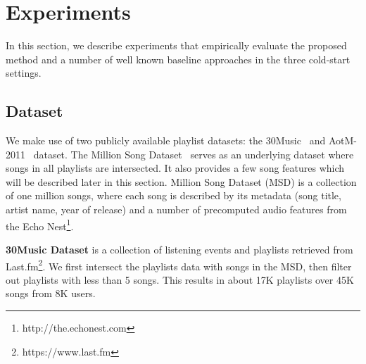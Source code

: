 \section{Experiments}
\label{sec:experiment}

In this section, we describe experiments that empirically evaluate the proposed method and a number of 
well known baseline approaches in the three cold-start settings. %


\subsection{Dataset}
We make use of two publicly available playlist datasets: the 30Music~\cite{30music2015} and AotM-2011~\cite{mcfee2012hypergraph} dataset.
The Million Song Dataset~\cite{msd2011} serves as an underlying dataset where songs in all playlists are intersected.
It also provides a few song features which will be described later in this section.
Million Song Dataset (MSD) is a collection of one million songs, where each song is described by its metadata 
(\eg song title, artist name, year of release) and a number of precomputed audio features from the Echo Nest\footnote{http://the.echonest.com}.


\begin{table}[hbt]
\centering
\caption{Music playlist dataset}
\label{tab:stats_pldata}
\end{table}



\noindent
{\bf 30Music Dataset} is a collection of listening events and playlists retrieved from Last.fm\footnote{https://www.last.fm}.
We first intersect the playlists data with songs in the MSD, 
then filter out playlists with less than 5 songs.
This results in about 17K playlists over 45K songs from 8K users.

